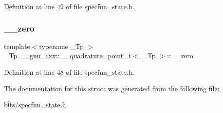 Definition at line 49 of file specfun\+\_\+state.\+h.

\mbox{\label{struct____gnu__cxx_1_1____quadrature__point__t_a9fe76d952db0e4c8a10f81da8c811719}} 
\subsubsection{\texorpdfstring{\+\_\+\+\_\+zero}{\_\_zero}}
{\footnotesize\ttfamily template$<$typename \+\_\+\+Tp $>$ \\
\+\_\+\+Tp \hyperlink{struct____gnu__cxx_1_1____quadrature__point__t}{\+\_\+\+\_\+gnu\+\_\+cxx\+::\+\_\+\+\_\+quadrature\+\_\+point\+\_\+t}$<$ \+\_\+\+Tp $>$\+::\+\_\+\+\_\+zero}



Definition at line 48 of file specfun\+\_\+state.\+h.



The documentation for this struct was generated from the following file\+:\begin{DoxyCompactItemize}
\item 
bits/\hyperlink{specfun__state_8h}{specfun\+\_\+state.\+h}\end{DoxyCompactItemize}

